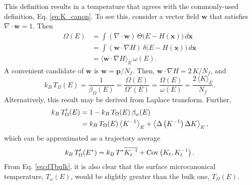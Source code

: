 \documentclass[reprint]{revtex4-1}
\begin{document}
This definition results in a temperature that
agrees with the commonly-used definition,
Eq. \eqref{eq:K_canon}.
%
To see this,
consider a vector field $\mathbf w$
that satisfies $\nabla \cdot \mathbf w = 1$.
Then
%
\begin{align*}
  \Omega(E)
  &=
  \int
    \left(
      \nabla \cdot \mathbf w
    \right)
    \,
    \Theta\bigl(
      E - H(\mathbf x)
    \bigr)
    \, d\mathbf x
  \\
  &=
  \int
    \left( \mathbf w \cdot \nabla H \right)
    \,
    \delta\bigl(
      E - H(\mathbf x)
    \bigr)
    \, d\mathbf x
  \\
  &= \langle \mathbf w \cdot \nabla H \rangle_E
    \,
    \omega(E)
  .
\end{align*}
%
A convenient candidate of $\mathbf w$ is
$\mathbf w = \mathbf p / N_f$.
%
Then,
$\mathbf w \cdot \nabla H = 2 \, K / N_f$,
and
%
\begin{equation}
  k_B \, T_\Omega(E)
  =
  \frac{ 1 } { \beta_\Omega(E) }
  =
  \frac{ \Omega(E) } { \Omega'(E) }
  =
  \frac{ \Omega(E) } { \omega(E) }
  =
  \frac{ 2 \, \langle K \rangle_E } { N_f }
  .
  \label{eq:Tbulk}
\end{equation}
%
Alternatively, this result may be derived from Laplace transform\cite{haile}.
%
Further,
%
\begin{align}
  k_B \, T'_\Omega(E)
  &=
  1 - k_B \, T_\Omega(E) \, \beta_\omega(E)
  \label{eq:dTbulk}
  \\
  &=
  k_B \, T_\Omega(E)
  \left\langle
  K^{-1}
  \right\rangle_E
  +
  \left\langle
  \Delta \left( K^{-1} \right)
  \Delta K
  \right\rangle_E
  ,
  \notag
\end{align}
%
which can be approximated as a trajectory average
%
\begin{equation}
  k_B \, T'_\Omega(E^*)
  =
  k_B \, T^* \overline{ K_t^{-1} }
  +
  \mathrm{Cov}\left(
    K_t, K_t^{-1}
  \right)
  .
  \notag
\end{equation}
%
From Eq. \eqref{eq:dTbulk},
it is also clear that the surface microcanonical temperature,
$T_\omega(E)$,
would be slightly greater than the bulk one, $T_\Omega(E)$.
%
%
%
\end{document}
